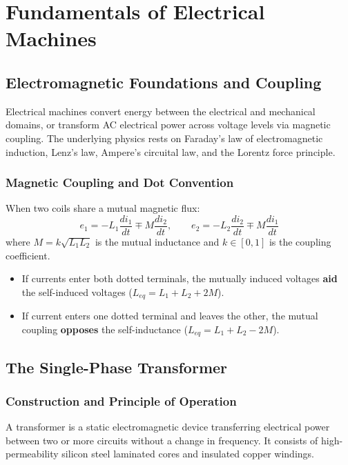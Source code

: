 \chapter{Fundamentals of Electrical Machines}
\label{chap:machines}

\section{Electromagnetic Foundations and Coupling}
Electrical machines convert energy between the electrical and mechanical domains, or transform AC electrical power across voltage levels via magnetic coupling. The underlying physics rests on Faraday's law of electromagnetic induction, Lenz's law, Ampere's circuital law, and the Lorentz force principle.

\subsection{Magnetic Coupling and Dot Convention}
When two coils share a mutual magnetic flux:
\begin{equation}
e_1 = -L_1 \frac{di_1}{dt} \mp M \frac{di_2}{dt}, \qquad e_2 = -L_2 \frac{di_2}{dt} \mp M \frac{di_1}{dt}
\end{equation}
where $M = k\sqrt{L_1 L_2}$ is the mutual inductance and $k \in [0, 1]$ is the coupling coefficient.
\begin{definition}
\begin{itemize}
    \item If currents enter both dotted terminals, the mutually induced voltages \textbf{aid} the self-induced voltages ($L_{eq} = L_1 + L_2 + 2M$).
    \item If current enters one dotted terminal and leaves the other, the mutual coupling \textbf{opposes} the self-inductance ($L_{eq} = L_1 + L_2 - 2M$).
\end{itemize}
\end{definition}

\section{The Single-Phase Transformer}

\subsection{Construction and Principle of Operation}
A transformer is a static electromagnetic device transferring electrical power between two or more circuits without a change in frequency. It consists of high-permeability silicon steel laminated cores and insulated copper windings.


